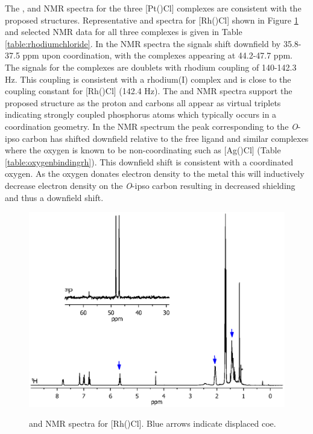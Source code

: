 The \proton{}, \carbon{} and \phosphorus{} NMR spectra for the three [Pt(\tBuxantphosk)Cl] complexes are consistent with the proposed structures.  Representative \proton{} and \phosphorus{} spectra for [Rh(\tBuxantphos)Cl] shown in Figure \ref{RhClnmr} and selected NMR data for all three complexes is given in Table \ref{table:rhodiumchloride}.  In the \phosphorus{} NMR spectra the signals shift downfield by 35.8-37.5 ppm upon coordination, with the complexes appearing at 44.2-47.7 ppm.  The signals for the complexes are doublets with rhodium coupling of 140-142.3 Hz.  This coupling is consistent with a rhodium(I) complex and is close to the coupling constant for [Rh(\iPrxantphosk)Cl] (142.4 Hz).\cite{Esteruelas2013}  The \proton{} and \carbon{} NMR spectra support the proposed structure as the \tBu{} proton and carbons all appear as virtual triplets indicating strongly coupled phosphorus atoms which typically occurs in a \trans{} coordination geometry.  In the \carbon{} NMR spectrum the peak corresponding to the \emph{O}-ipso carbon has shifted downfield relative to the free ligand and similar complexes where the oxygen is known to be non-coordinating such as [Ag(\tBuxantphos)Cl] (Table \ref{table:oxygenbindingrh}).  This downfield shift is consistent with a coordinated oxygen.  As the oxygen donates electron density to the metal this will inductively decrease electron density on the \emph{O}-ipso carbon resulting in decreased shielding and thus a downfield shift.  %

\begin{figure}[htbp]
\begin{center}
\vspace{0.5cm}
\includegraphics[trim = 2.5cm 4.0cm 2.5cm 15cm, clip]{../NMR/7004B.eps}
\caption[\phosphorus{} and \proton{} NMR spectra for [Rh(\tBuxantphos)Cl{]}]{\phosphorus{} and \proton{} NMR spectra for [Rh(\tBuxantphos)Cl].  Blue arrows indicate displaced \acrshort{coe}.}
\vspace{0.2cm}
\label{RhClnmr}
\end{center}
\end{figure}
\vspace{0.2cm}

